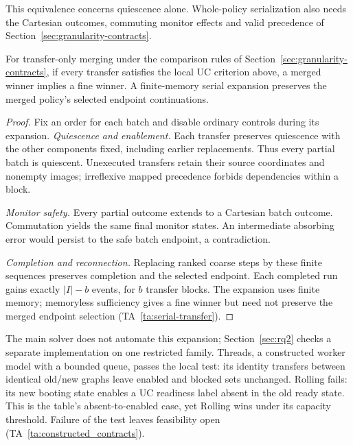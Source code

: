 \documentclass[acmsmall,screen,review,anonymous]{acmart}
\begin{document}
This equivalence concerns quiescence alone. Whole-policy serialization also needs the Cartesian outcomes, commuting monitor effects and valid precedence of Section~\ref{sec:granularity-contracts}.
\begin{proposition}\label{prop:serial-transfer}
For transfer-only merging under the comparison rules of Section~\ref{sec:granularity-contracts}, if every transfer satisfies the local UC criterion above, a merged winner implies a fine winner. A finite-memory serial expansion preserves the merged policy's selected endpoint continuations.
\end{proposition}
\begin{proof}
Fix an order for each batch and disable ordinary controls during its expansion.
\emph{Quiescence and enablement.} Each transfer preserves quiescence with the other components fixed, including earlier replacements. Thus every partial batch is quiescent. Unexecuted transfers retain their source coordinates and nonempty images; irreflexive mapped precedence forbids dependencies within a block.

\emph{Monitor safety.} Every partial outcome extends to a Cartesian batch outcome. Commutation yields the same final monitor states. An intermediate absorbing error would persist to the safe batch endpoint, a contradiction.

\emph{Completion and reconnection.} Replacing ranked coarse steps by these finite sequences preserves completion and the selected endpoint. Each completed run gains exactly $|I|-b$ events, for $b$ transfer blocks. The expansion uses finite memory; memoryless sufficiency gives a fine winner but need not preserve the merged endpoint selection (TA~\ref{ta:serial-transfer}).
\end{proof}
The main solver does not automate this expansion; Section~\ref{sec:rq2} checks a separate implementation on one restricted family. Threads, a constructed worker model with a bounded queue, passes the local test: its identity transfers between identical old/new graphs leave enabled and blocked sets unchanged. Rolling fails: its new booting state enables a UC readiness label absent in the old ready state. This is the table's absent-to-enabled case, yet Rolling wins under its capacity threshold. Failure of the test leaves feasibility open (TA~\ref{ta:constructed_contracts}).
\end{document}
